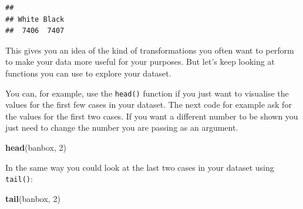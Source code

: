 \documentclass[]{book}
\newenvironment{Shaded}{\begin{snugshade}}{\end{snugshade}}
\newcommand{\CommentTok}[1]{\textcolor[rgb]{0.56,0.35,0.01}{\textit{#1}}}
\newcommand{\DecValTok}[1]{\textcolor[rgb]{0.00,0.00,0.81}{#1}}
\newcommand{\KeywordTok}[1]{\textcolor[rgb]{0.13,0.29,0.53}{\textbf{#1}}}
\newcommand{\NormalTok}[1]{#1}
\newcommand{\OperatorTok}[1]{\textcolor[rgb]{0.81,0.36,0.00}{\textbf{#1}}}
\newcommand{\StringTok}[1]{\textcolor[rgb]{0.31,0.60,0.02}{#1}}
\theoremstyle{definition}
\theoremstyle{definition}
\theoremstyle{definition}
\theoremstyle{remark}
\begin{document}
\begin{Shaded}
\end{Shaded}

\begin{verbatim}
## 
## White Black 
##  7406  7407
\end{verbatim}

This gives you an idea of the kind of transformations you often want to
perform to make your data more useful for your purposes. But let's keep
looking at functions you can use to explore your dataset.

You can, for example, use the \texttt{head()} function if you just want
to visualise the values for the first few cases in your dataset. The
next code for example ask for the values for the first two cases. If you
want a different number to be shown you just need to change the number
you are passing as an argument.

\begin{Shaded}
\begin{Highlighting}[]
\KeywordTok{head}\NormalTok{(banbox, }\DecValTok{2}\NormalTok{)}
\end{Highlighting}
\end{Shaded}

In the same way you could look at the last two cases in your dataset
using \texttt{tail()}:

\begin{Shaded}
\begin{Highlighting}[]
\KeywordTok{tail}\NormalTok{(banbox, }\DecValTok{2}\NormalTok{)}
\end{Highlighting}
\end{Shaded}
\end{document}
